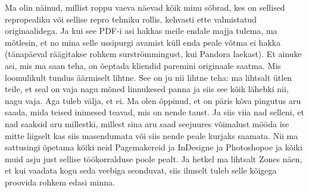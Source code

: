 Ma olin näinud, millist roppu vaeva näevad kõik minu  sõbrad, kes on sellised 
repropealiku või  sellise repro tehniku rollis,  kehvasti ette valmistatud 
originaalidega. Ja kui see PDF-i asi hakkas meile endale majja tulema, ma 
mõtlesin, et no mina selle ussipurgi avamist küll enda peale võtma ei hakka 
(tänapäeval räägitakse rohkem surströmmingust, kui Pandora laekast). Et ainuke 
asi, mis ma saan teha, on õeptada kliendid paremini originaale saatma. Mis 
loomulikult tundus äärmiselt lihtne. See on ju nii lihtne teha:  ma lihtsalt 
ütlen teile, et seal on vaja nagu mõned linnukesed panna ja siis see kõik 
lähebki nii, nagu vaja. Aga tuleb välja, et ei. Ma olen õppinud, et on päris 
kõva pingutus aru saada,  mida teised inimesed teavad, mis on nende taust. Ja 
siis viia nad selleni, et nad saaksid aru millestki, millest sina aru saad 
seejuures võimalust mööda ise mitte liigselt kas siis masendumata või siis 
nende peale kurjaks saamata. Nii ma sattusingi õpetama  kõiki neid Pagemakereid 
ja InDesigne ja Photoshopoe ja kõiki muid asju just sellise töökorralduse poole 
pealt. Ja hetkel ma lihtsalt Zones näen, et kui vaadata kogu seda veebiga 
seonduvat, siis ilmselt tuleb selle kõigega proovida rohkem edasi minna. 